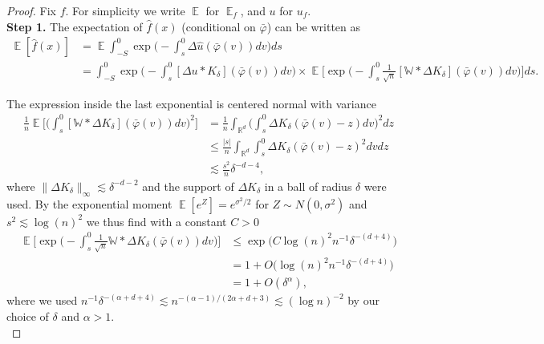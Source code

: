 \documentclass{article}
\numberwithin{equation}{section}
\theoremstyle{definition}
\DeclareMathOperator{\E}{{\mathbb E}}
\DeclareMathOperator{\R}{{\mathbb R}}
\providecommand{\abs}[1]{\lvert #1 \rvert}
\providecommand{\norm}[1]{\lVert #1 \rVert}
\renewcommand{\le}{\leqslant}
\begin{document}
\begin{proof} Fix $f$. For simplicity we write $\E$ for $\E_f$, and $u$ for $u_f$. \\
\noindent \textbf{Step 1.}  The expectation of $\hat f(x)$ (conditional on $\bar\varphi$) can be written as 
\begin{align*}
   \E[\hat f(x)] &= \E  \int_{-S}^0 \exp\Big(-\int_s^0 \Delta \hat u(\bar \varphi(v))dv  \Big) ds\\
   & =\int_{-S}^0 \exp\Big(-\int_s^0 [\Delta u \ast K_\delta] (\bar \varphi(v))dv  \Big)  \times \E \Big[ \exp\Big(-\int_s^0 \frac 1{\sqrt n} [\mathbb W \ast \Delta K_\delta] (\bar \varphi(v))dv  \Big) \Big] ds.
\end{align*}



The expression inside the last exponential is centered normal with variance
\begin{align*}
 \frac1n\E\Big[\Big(\int_s^0[\mathbb W \ast \Delta K_\delta] (\bar \varphi(v))dv\Big)^2\Big]  
 &= \frac1n\int_{\R^d} \Big(\int_s^0 \Delta K_\delta (\bar \varphi(v)-z) dv\Big)^2 dz\\
 &\le \frac {\abs{s}}n\int_{\R^d} \int_s^0 \Delta K_\delta (\bar \varphi(v)-z)^2 dv dz\\
 &\lesssim  \frac {s^2}n  \delta^{-d-4},
\end{align*}
where $\norm{\Delta K_\delta}_\infty\lesssim \delta^{-d-2}$ and the support of $\Delta K_\delta$ in a ball of radius $\delta$ were used. By the exponential moment $\E[e^Z]=e^{\sigma^2/2}$ for $Z\sim N(0,\sigma^2)$ and $s^2\lesssim \log(n)^2$ we thus find with a constant $C>0$
\begin{align*}
    \E \Big[ \exp\Big(-\int_s^0 \frac 1{\sqrt n} \mathbb W \ast \Delta K_\delta(\bar \varphi(v))dv  \Big) \Big] &\le \exp\Big(C\log(n)^2n^{-1}\delta^{-(d+4)}\Big)
\\
&=1+O\Big(\log(n)^2n^{-1}\delta^{-(d+4)}\Big)\\
&= 1+O(\delta^\alpha),
\end{align*}
where we used $n^{-1}\delta^{-(\alpha+d+4)}\lesssim n^{-(\alpha-1)/(2\alpha+d+3)}\lesssim (\log n)^{-2}$ by our choice of $\delta$ and $\alpha>1$.\\



\end{proof}
\end{document}
